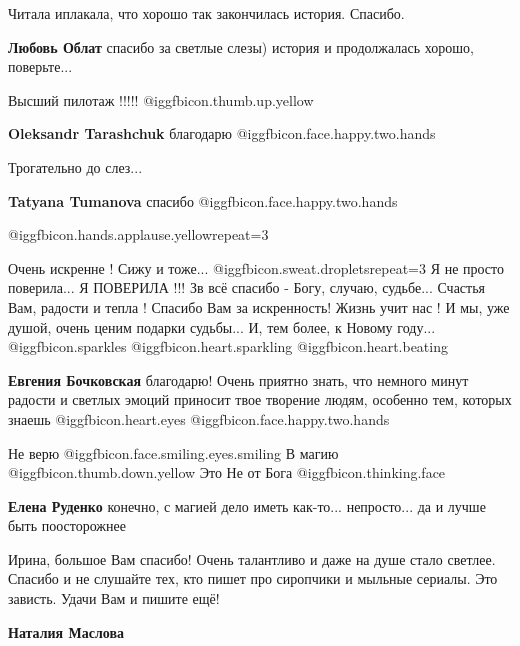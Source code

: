 \begin{itemize}
Читала иплакала, что хорошо так закончилась история. Спасибо.

\textbf{Любовь Облат} спасибо за светлые слезы) история и продолжалась хорошо, поверьте...

Высший пилотаж !!!!!  @igg{fbicon.thumb.up.yellow} 

\textbf{Oleksandr Tarashchuk} благодарю @igg{fbicon.face.happy.two.hands} 

Трогательно до слез...

\textbf{Tatyana Tumanova} спасибо @igg{fbicon.face.happy.two.hands} 

 @igg{fbicon.hands.applause.yellow}{repeat=3} 


\obeycr
Очень искренне ! Сижу и тоже... @igg{fbicon.sweat.droplets}{repeat=3} 
Я не просто поверила... Я ПОВЕРИЛА !!!
Зв всё спасибо - Богу, случаю, судьбе...
Счастья Вам, радости и тепла !
Спасибо Вам за искренность!
Жизнь учит нас ! И мы, уже душой,
очень ценим подарки судьбы...
И, тем более, к Новому году...  @igg{fbicon.sparkles}  @igg{fbicon.heart.sparkling}  @igg{fbicon.heart.beating} 
\restorecr

\begin{itemize} %
\textbf{Евгения Бочковская} благодарю! Очень приятно знать, что немного минут радости и светлых эмоций приносит твое творение людям, особенно тем, которых знаешь @igg{fbicon.heart.eyes}  @igg{fbicon.face.happy.two.hands} 
\end{itemize} %

Не верю  @igg{fbicon.face.smiling.eyes.smiling} 
В магию @igg{fbicon.thumb.down.yellow} 
Это
Не от Бога @igg{fbicon.thinking.face} 

\begin{itemize} %
\textbf{Елена Руденко} конечно, с магией дело иметь как-то... непросто... да и лучше быть поосторожнее
\end{itemize} %


Ирина, большое Вам спасибо! Очень талантливо и даже на душе стало светлее.
Спасибо и не слушайте тех, кто пишет про сиропчики и мыльные сериалы. Это
зависть. Удачи Вам и пишите ещё!

\begin{itemize} %
\textbf{Наталия Маслова} 


\end{itemize}
\end{itemize}
